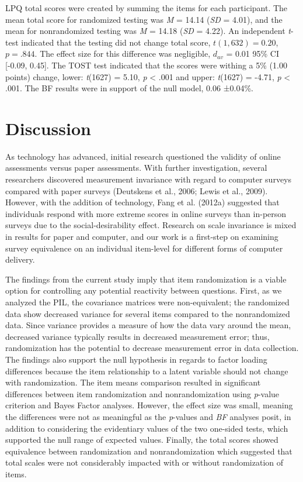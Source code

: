 \documentclass[english,man, mask]{apa6}
\theoremstyle{definition}
\theoremstyle{definition}
\theoremstyle{definition}
\theoremstyle{remark}
\begin{document}
LPQ total scores were created by summing the items for each participant.
The mean total score for randomized testing was \emph{M} = 14.14
(\emph{SD} = 4.01), and the mean for nonrandomized testing was \emph{M}
= 14.18 (\emph{SD} = 4.22). An independent \emph{t}-test indicated that
the testing did not change total score, \(t(1,632) = 0.20\),
\(p = .844\). The effect size for this difference was negligible,
\(d_{av}\) = 0.01 95\% CI {[}-0.09, 0.45{]}. The TOST test indicated
that the scores were withing a 5\% (1.00 points) change, lower:
\emph{t}(1627) = 5.10, \emph{p} \textless{} .001 and upper:
\emph{t}(1627) = -4.71, \emph{p} \textless{} .001. The BF results were
in support of the null model, 0.06 ±0.04\%.

\section{Discussion}\label{discussion}

As technology has advanced, initial research questioned the validity of
online assessments versus paper assessments. With further investigation,
several researchers discovered measurement invariance with regard to
computer surveys compared with paper surveys (Deutskens et al., 2006;
Lewis et al., 2009). However, with the addition of technology, Fang et
al. (2012a) suggested that individuals respond with more extreme scores
in online surveys than in-person surveys due to the social-desirability
effect. Research on scale invariance is mixed in results for paper and
computer, and our work is a first-step on examining survey equivalence
on an individual item-level for different forms of computer delivery.

The findings from the current study imply that item randomization is a
viable option for controlling any potential reactivity between
questions. First, as we analyzed the PIL, the covariance matrices were
non-equivalent; the randomized data show decreased variance for several
items compared to the nonrandomized data. Since variance provides a
measure of how the data vary around the mean, decreased variance
typically results in decreased measurement error; thus, randomization
has the potential to decrease measurement error in data collection. The
findings also support the null hypothesis in regards to factor loading
differences because the item relationship to a latent variable should
not change with randomization. The item means comparison resulted in
significant differences between item randomization and nonrandomization
using \emph{p}-value criterion and Bayes Factor analyses. However, the
effect size was small, meaning the differences were not as meaningful as
the \emph{p}-values and \emph{BF} analyses posit, in addition to
considering the evidentiary values of the two one-sided tests, which
supported the null range of expected values. Finally, the total scores
showed equivalence between randomization and nonrandomization which
suggested that total scales were not considerably impacted with or
without randomization of items.
\end{document}
